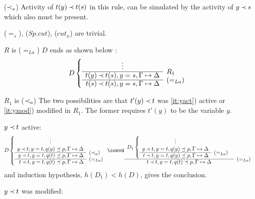 \begin{PROOF}
\begin{LS}
\begin{LSA}
($\mathbin{\prec}_s$) Activity of $t(y)\mathbin{\prec} t(s)$ in this rule, can be simulated by
the activity of $y\mathbin{\prec} s$ which also must be present.

($=_s$), ($Sp.cut$), ($cut_x$) are trivial.
\end{LSA}
%
\item  $R$ is ($=_{La}$) $D$ ends as shown below :
\[ D \left \{ \begin{array}{rl}
\multicolumn{1}{c}{\vdots} \\ \cline{1-1}
t(y)\Incl t(s), y=s, \Gamma\Seq\Delta & \rabove{R_1} \\ \cline{1-1}
t(s) \Incl t(s), y=s, \GSD & \rabove{(=_{La})} \end{array} \right .\]
%
\begin{LSA}
%
\item $R_1$ is ($\mathbin{\prec}_a$) The two possibilities are that $t'(y)\mathbin{\prec} t$ was
\ref{it:yact}) active
or \ref{it:ymod}) modified in $R_1$. The former requires $t'(y)$ to be the variable
$y$.
\begin{LSB}
\item\label{it:yact} $y\mathbin{\prec} t$ active:
\[ D \left \{ \begin{array}{rl}
\multicolumn{1}{c}{\vdots} \\ 
y\Incl t, y=t, q(y)\preceq p, \Gamma\Seq\Delta  \\ \cline{1-1}
y\Incl t, y=t, q(t)\preceq p, \Gamma\Seq\Delta & \rabove{(\Incl_a)} \\ \cline{1-1}
t \Incl t, y=t, q(t)\preceq p, \GSD & \rabove{(=_{La})} \end{array} \right
. \convd
  \begin{array}{cl} D_1 \left \{ \begin{array}{rl}
\multicolumn{1}{c}{\vdots} \\ 
y\Incl t, y=t, q(y)\preceq p, \Gamma\Seq\Delta  \\ \cline{1-1}
t\Incl t, y=t, q(y)\preceq p, \Gamma\Seq\Delta & \rabove{(=_{La})} \end{array}
\right . \\ \cline{1-1}
t \Incl t, y=t, q(t)\preceq p, \GSD & \rabove{(=_{La})} \end{array} \]
and induction hypothesis, $h(D_1)<h(D)$, gives the conclusion. 
%
\item\label{it:ymod} $y\mathbin{\prec} t$ was modified:

\end{LSB}
\end{LSA}
\end{LS}
\end{PROOF}
